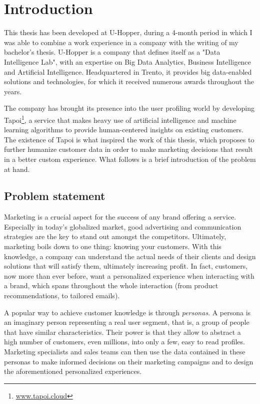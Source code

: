 \chapter{Introduction}
\label{cha:intro}
This thesis has been developed at U-Hopper, during a 4-month period in which I was able to combine a work experience in a company with the writing of my bachelor's thesis. U-Hopper is a company that defines itself as a "Data Intelligence Lab", with an expertise on Big Data Analytics, Business Intelligence and Artificial Intelligence. Headquartered in Trento, it provides big data-enabled solutions and technologies, for which it received numerous awards throughout the years.

The company has brought its presence into the user profiling world by developing Tapoi\footnote{\url{www.tapoi.cloud}}, a service that makes heavy use of artificial intelligence and machine learning algorithms to provide human-centered insights on existing customers. The existence of Tapoi is what inspired the work of this thesis, which proposes to further humanize customer data in order to make marketing decisions that result in a better custom experience. What follows is a brief introduction of the problem at hand.

\section{Problem statement}
Marketing is a crucial aspect for the success of any brand offering a service. Especially in today's globalized market, good advertising and communication strategies are the key to stand out amongst the competitors. Ultimately, marketing boils down to one thing: knowing your customers. With this knowledge, a company can understand the actual needs of their clients and design solutions that will satisfy them, ultimately increasing profit. In fact, customers, now more than ever before, want a personalized experience when interacting with a brand, which spans throughout the whole interaction (from product recommendations, to tailored emails).

A popular way to achieve customer knowledge is through \textit{personas}. A persona is an imaginary person representing a real user segment, that is, a group of people that have similar characteristics. Their power is that they allow to abstract a high number of customers, even millions, into only a few, easy to read profiles. Marketing specialists and sales teams can then use the data contained in these personas to make informed decisions on their marketing campaigns and to design the aforementioned personalized experiences. 

